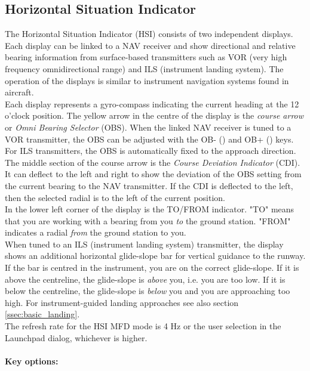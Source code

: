 \documentclass[Orbiter User Manual.tex]{subfiles}
\begin{document}
\subsection{Horizontal Situation Indicator}
\label{ssec:mfd_hsi}
The Horizontal Situation Indicator (HSI) consists of two independent displays. Each display can be linked to a NAV receiver and show directional and relative bearing information from surface-based transmitters such as VOR (very high frequency omnidirectional range) and ILS (instrument landing system). The operation of the displays is similar to instrument navigation systems found in aircraft.\\
Each display represents a gyro-compass indicating the current heading at the 12 o'clock position. The yellow arrow in the centre of the display is the \textit{course arrow} or \textit{Omni Bearing Selector} (OBS). When the linked NAV receiver is tuned to a VOR transmitter, the OBS can be adjusted with the OB- (\Shift\keystroke{[}) and OB+ (\Shift\keystroke{]}) keys. For ILS transmitters, the OBS is automatically fixed to the approach direction.\\
The middle section of the course arrow is the \textit{Course Deviation Indicator} (CDI). It can deflect to the left and right to show the deviation of the OBS setting from the current bearing to the NAV transmitter. If the CDI is deflected to the left, then the selected radial is to the left of the current position.\\
In the lower left corner of the display is the TO/FROM indicator. "TO" means that you are working with a bearing from you \textit{to} the ground station. "FROM" indicates a radial \textit{from} the ground station to you.\\
When tuned to an ILS (instrument landing system) transmitter, the display shows an additional horizontal glide-slope bar for vertical guidance to the runway. If the bar is centred in the instrument, you are on the correct glide-slope. If it is above the centreline, the glide-slope is \textit{above} you, i.e. you are too low. If it is below the centreline, the glide-slope is \textit{below} you and you are approaching too high. For instrument-guided landing approaches see also section \ref{ssec:basic_landing}.\\
The refresh rate for the HSI MFD mode is 4 Hz or the user selection in the Launchpad dialog, whichever is higher.\\
\\
\textbf{Key options:}
\end{document}
